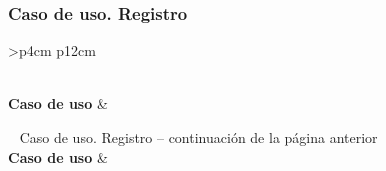 \subsubsection{Caso de uso. Registro} \label{sec:cu_registro}
\begin{longtable}{
    >{}p{4cm}
    p{12cm}
    }
    \caption{Caso de uso. Registro} \label{table:cu_registro} \\
    \toprule
    \textbf{Caso de uso} &  \\
    \endfirsthead
    
    {{ \tablename\ \thetable{} Caso de uso. Registro -- continuación de la página anterior}} \\
    \toprule
    \textbf{Caso de uso} &  \\
    \midrule
    \endhead
    
    \midrule
     \\ 
    \endfoot
    
    \bottomrule
    \endlastfoot
    

\end{longtable}
